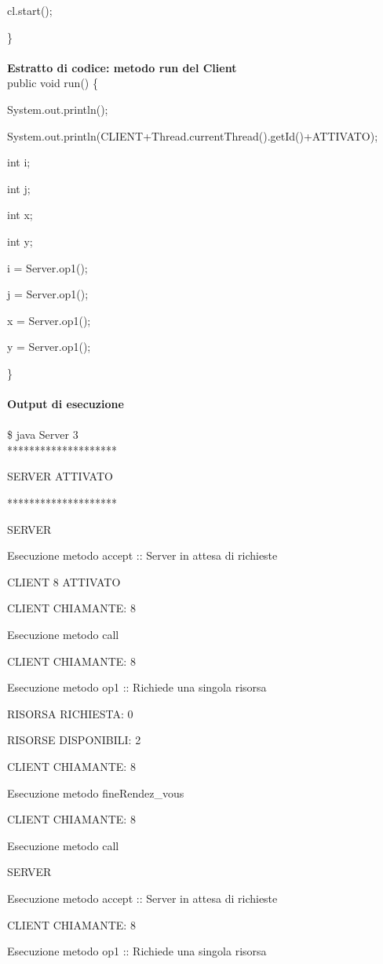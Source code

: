 \documentclass[10pt, a4paper]{article}
\begin{document}
	cl.start();

\}
\\\\
\textbf{Estratto di codice: metodo run del Client}
\\

public void run() \{

		System.out.println();

        	System.out.println(CLIENT+Thread.currentThread().getId()+ATTIVATO);

		int i;

		int j;
		
		int x;

		int y;

		i = Server.op1();

		j = Server.op1();

		x = Server.op1();

		y = Server.op1();

\}
\\\\
\textbf{Output di esecuzione}
\\\\
\$ java Server 3
\\

********************

SERVER ATTIVATO

********************

SERVER

Esecuzione metodo accept :: Server in attesa di richieste

CLIENT 8 ATTIVATO

CLIENT CHIAMANTE: 8

Esecuzione metodo call

CLIENT CHIAMANTE: 8

Esecuzione metodo op1 :: Richiede una singola risorsa

RISORSA RICHIESTA: 0

RISORSE DISPONIBILI: 2

CLIENT CHIAMANTE: 8

Esecuzione metodo fineRendez\_vous

CLIENT CHIAMANTE: 8

Esecuzione metodo call

SERVER

Esecuzione metodo accept :: Server in attesa di richieste

CLIENT CHIAMANTE: 8

Esecuzione metodo op1 :: Richiede una singola risorsa
\end{document}

